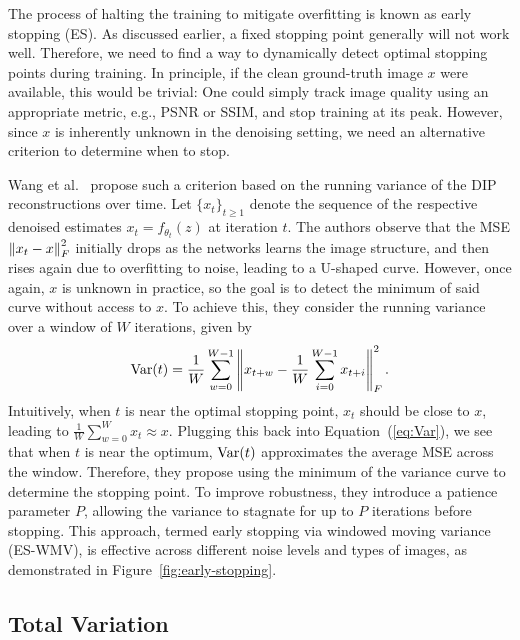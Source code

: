 The process of halting the training to mitigate overfitting is known as early stopping (ES).
As discussed earlier, a fixed stopping point generally will not work well.
Therefore, we need to find a way to dynamically detect optimal stopping points during training.
In principle, if the clean ground-truth image $x$ were available, this would be trivial:
One could simply track image quality using an appropriate metric, e.g., PSNR or SSIM, and stop training at its peak.
However, since $x$ is inherently unknown in the denoising setting, we need an alternative criterion to determine when to stop.

Wang et al.~\cite{ES} propose such a criterion based on the running variance of the DIP reconstructions over time.
Let $\{x_t\}_{t \geq 1}$ denote the sequence of the respective denoised estimates $x_t = f_{\theta_t}(z)$ at iteration $t$.
The authors observe that the MSE $\left\lVert x_t-x\right\rVert_F^2$ initially drops as the networks learns the image structure, and then rises again due to overfitting to noise, leading to a U-shaped curve.
However, once again, $x$ is unknown in practice, so the goal is to detect the minimum of said curve without access to $x$.
To achieve this, they consider the running variance over a window of $W$ iterations, given by
\begin{equation}\label{eq:Var}
    \operatorname{Var}(t) = \frac{1}{W} \sum_{w=0}^{W-1} \left\lVert x_{t+w}-\frac{1}{W} \sum_{i=0}^{W-1} x_{t+i}\right\rVert_F^2.
\end{equation}
Intuitively, when $t$ is near the optimal stopping point, $x_t$ should be close to $x$, leading to $\frac{1}{W} \sum_{w=0}^{W} x_t \approx x$.
Plugging this back into Equation~(\ref{eq:Var}), we see that when $t$ is near the optimum, $\operatorname{Var}(t)$ approximates the average MSE across the window.
Therefore, they propose using the minimum of the variance curve to determine the stopping point.
To improve robustness, they introduce a patience parameter $P$, allowing the variance to stagnate for up to $P$ iterations before stopping.
This approach, termed early stopping via windowed moving variance (ES-WMV), is effective across different noise levels and types of images, as demonstrated in Figure~\ref{fig:early-stopping}. 

\subsection{Total Variation}

